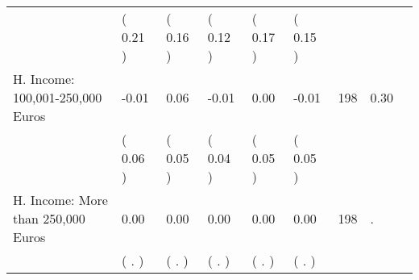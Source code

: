 \begin{tabular}{L{6.2cm} C{1.8cm} C{1.8cm} C{1.8cm} C{1.8cm} C{1.8cm} C{1.8cm} C{0.3cm} C{0.3cm}}
 & (     0.21 ) & (     0.16 ) & (     0.12 ) & (     0.17 ) & (     0.15 )  & \\
H. Income: 100,001-250,000 Euros &     -0.01 &      0.06 &     -0.01 &      0.00 &     -0.01  & 198 &       0.30 \\ 
 & (     0.06 ) & (     0.05 ) & (     0.04 ) & (     0.05 ) & (     0.05 )  & \\
H. Income: More than 250,000 Euros &      0.00 &      0.00 &      0.00 &      0.00 &      0.00  & 198 &          . \\ 
 & (        . ) & (        . ) & (        . ) & (        . ) & (        . )  & \\
\bottomrule
\end{tabular}
